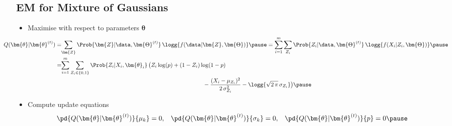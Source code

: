 \begin{slide}
\section{EM for Mixture of Gaussians}

\begin{PauseHighLight}
  \begin{itemize}
  \item Maximise with respect to parameters $\bm{\theta}$
    {\small
      \begin{align*}
       \hspace{-1.5cm} Q(\bm{\theta}|\bm{\theta}^{(t)})
      &=\!\! \sum_{\bm{Z}} \Prob{\bm{Z}|\data,\bm{\Theta}^{(t)}}\,
        \logg{f(\data|\bm{Z}, \bm{\Theta})} \pause
        = \sum_{i=1}^m \sum_{Z_i }\Prob{Z_i|\data,\bm{\Theta}^{(t)}}\,
        \logg{f(X_i|Z_i, \bm{\Theta})}\pause
        \\
      &=\!\!\sum_{i=1}^m \sum_{Z_i\in\{0,1\}} \Prob{Z_i|X_i,\bm{\theta}_i}\,
        \bigl( Z_i \log(p) + (1-Z_i)\log(1-p) \\
        & \hspace{9cm}  -
        \frac{(X_i-\mu_{Z_i})^2}{2\,\sigma^2_{Z_i}} - \logg{\sqrt{2\,\pi}\,\sigma_{Z_i}} \bigr)\pause
    \end{align*} }
  \item Compute update equations
    \begin{align*}
      \pd{Q(\bm{\theta}|\bm{\theta}^{(t)})}{\mu_k}=0,
      &&
         \pd{Q(\bm{\theta}|\bm{\theta}^{(t)})}{\sigma_k}=0,
      &&
          \pd{Q(\bm{\theta}|\bm{\theta}^{(t)})}{p}=0\pause
    \end{align*}
  \end{itemize}
\end{PauseHighLight}

\end{slide}


